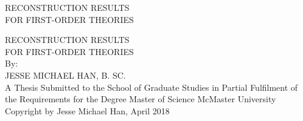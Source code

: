 \documentclass[12pt]{report}
\begin{document}
\begin{titlepage} %
    \thispagestyle{empty}
    \vspace*{\fill}
    \begin{center}{\Large
    \uppercase{Reconstruction results \\ for first-order theories}}
    \end{center}
    \vspace*{\fill}
    \setcounter{page}{0} %
\end{titlepage}

\begin{titlepage} %
	\thispagestyle{empty}
	\centering
	\vspace*{\fill} %
	{\Large \uppercase{Reconstruction results \\ for first-order theories}\\
	\vfill
	By:\\ JESSE MICHAEL HAN, B. SC.\\}
	\vfill
	A Thesis Submitted to the School of Graduate Studies in Partial 	Fulfilment of
	the Requirements for the Degree Master of Science
	\vfill%
	McMaster University \textcopyright{} Copyright by Jesse Michael Han, April 2018
	
\end{titlepage}
\end{document}
